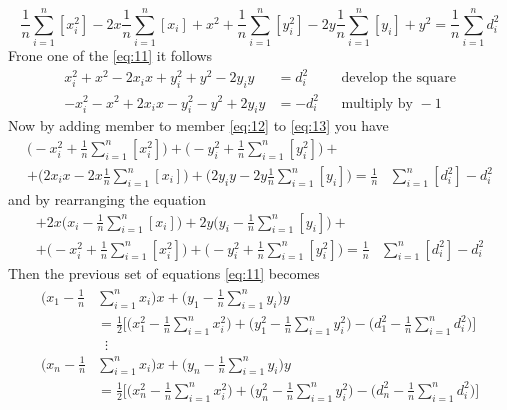 \documentclass[12pt]{report}
\begin{document}
\begin{equation}
    \frac{1}{n}\sum_{i=1}^n[x_i^2]-2x\frac{1}{n}\sum_{i=1}^n[x_i]+ x^2 + \frac{1}{n}\sum_{i=1}^n[y_i^2]-2y\frac{1}{n}\sum_{i=1}^n[y_i]+ y^2= \frac{1}{n}\sum_{i=1}^nd_i^2
    \label{eq:12}
\end{equation}
Frone one of the \eqref{eq:11} it follows
\begin{align}
x_i^2+x^2-2x_ix+y_i^2+y^2-2y_iy&=d_i^2 &&\text{develop the square}\\ 
-x_i^2-x^2+2x_ix-y_i^2-y^2+2y_iy&=-d_i^2 && \text{multiply by } -1
\label{eq:13}
\end{align}
Now by adding member to member \eqref{eq:12} to \eqref{eq:13} you have 
\begin{equation}
\begin{split}
    \bigg(-x_i^2  + \frac{1}{n}\sum_{i=1}^n[x_i^2]\bigg)+
    \bigg(-y_i^2+ \frac{1}{n}\sum_{i=1}^n[y_i^2]\bigg)+\\
    +\bigg(2x_ix-2x\frac{1}{n}\sum_{i=1}^n[x_i]\bigg)+
    \bigg(2y_iy -2y\frac{1}{n}\sum_{i=1}^n[y_i]\bigg)
    =\frac{1}{n}&\sum_{i=1}^n[d_i^2]-d_i^2
\end{split}    
\end{equation}
and by rearranging the equation
\begin{equation}
\begin{split}
    +2x\bigg(x_i-\frac{1}{n}\sum_{i=1}^n[x_i]\bigg)+
    2y\bigg(y_i -\frac{1}{n}\sum_{i=1}^n[y_i]\bigg)+\\
    +\bigg(-x_i^2  + \frac{1}{n}\sum_{i=1}^n[x_i^2]\bigg)+
    \bigg(-y_i^2+ \frac{1}{n}\sum_{i=1}^n[y_i^2]\bigg)
    =\frac{1}{n}&\sum_{i=1}^n[d_i^2]-d_i^2
\end{split}    
\end{equation}
Then the previous set of equations \eqref{eq:11} becomes
\begin{align}
\begin{split} 
    \bigg(x_1-\frac{1}{n}&\sum_{i=1}^nx_i\bigg)x+\bigg(y_1-\frac{1}{n}\sum_{i=1}^ny_i\bigg)y\\
    &=\frac{1}{2}\bigg[\bigg(x_1^2-\frac{1}{n}\sum_{i=1}^nx^2_i\bigg)+\bigg(y_1^2-\frac{1}{n}\sum_{i=1}^ny^2_i\bigg)-\bigg(d_1^2-\frac{1}{n}\sum_{i=1}^nd_i^2\bigg)\bigg]\\
&\;\;\vdots\\
    \bigg(x_n-\frac{1}{n}&\sum_{i=1}^nx_i\bigg)x+\bigg(y_n-\frac{1}{n}\sum_{i=1}^ny_i\bigg)y\\
    &=\frac{1}{2}\bigg[\bigg(x_n^2-\frac{1}{n}\sum_{i=1}^nx^2_i\bigg)+\bigg(y_n^2-\frac{1}{n}\sum_{i=1}^ny^2_i\bigg)-\bigg(d_n^2-\frac{1}{n}\sum_{i=1}^nd_i^2\bigg)\bigg]
\end{split}
\end{align}
\end{document}
